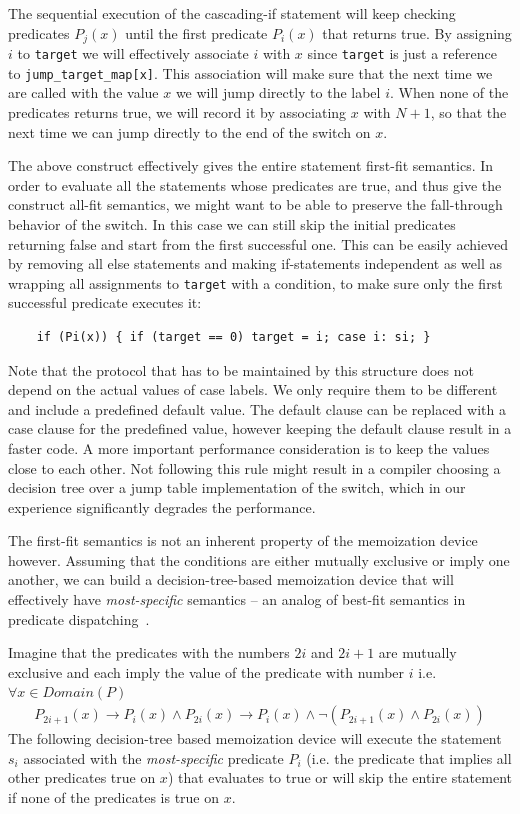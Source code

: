 \documentclass[preprint]{sigplanconf}
\makeatletter
\DeclareRobustCommand{\code}[1]{{\lstinline[breaklines=false,escapechar=@]{#1}}}
\makeatother
\begin{document}
The sequential execution of the cascading-if statement will keep checking 
predicates $P_j(x)$ until the first predicate $P_i(x)$ that returns true. By 
assigning $i$ to \code{target} we will effectively associate $i$ with $x$ since 
\code{target} is just a reference to \code{jump_target_map[x]}. This association 
will make sure that the next time we are called with the value $x$ we will jump 
directly to the label $i$. When none of the predicates returns true, we will 
record it by associating $x$ with $N+1$, so that the next time we can jump 
directly to the end of the switch on $x$. 

The above construct effectively gives the entire statement first-fit semantics. 
In order to evaluate all the statements whose predicates are true, and thus 
give the construct all-fit semantics, we might want to be able to preserve the 
fall-through behavior of the switch. In this case we can still skip the initial 
predicates returning false and start from the first successful one. This can be 
easily achieved by removing all else statements and making if-statements 
independent as well as wrapping all assignments to \code{target} with a condition, 
to make sure only the first successful predicate executes it:

\begin{lstlisting}
    if (Pi(x)) { if (target == 0) target = i; case i: si; }
\end{lstlisting}

\noindent
Note that the protocol that has to be maintained by this structure does not 
depend on the actual values of case labels. We only require them to be 
different and include a predefined default value. The default clause can be 
replaced with a case clause for the predefined value, however keeping the default  
clause result in a faster code. A more important performance consideration is to 
keep the values close to each other. Not following this rule might result in a 
compiler choosing a decision tree over a jump table implementation of the 
switch, which in our experience significantly degrades the performance.

The first-fit semantics is not an inherent property of the memoization device however. 
Assuming that the conditions are either mutually exclusive or imply one another, we 
can build a decision-tree-based memoization device that will effectively have 
\emph{most-specific} semantics -- an analog of best-fit semantics in predicate 
dispatching~\cite{ErnstKC98}.

Imagine that the predicates with the numbers $2i$ and $2i+1$ are mutually exclusive and 
each imply the value of the predicate with number $i$ i.e. $\forall x \in Domain(P)$
\begin{eqnarray*}
P_{2i+1}(x)\rightarrow P_i(x) \wedge P_{2i}(x)\rightarrow P_i(x) \wedge \neg(P_{2i+1}(x) \wedge P_{2i}(x))
\end{eqnarray*}
\noindent
The following decision-tree based memoization device will execute the statement 
$s_i$ associated with the \emph{most-specific} predicate $P_i$ (i.e. the 
predicate that implies all other predicates true on $x$) that evaluates to true or will 
skip the entire statement if none of the predicates is true on $x$.
\end{document}

